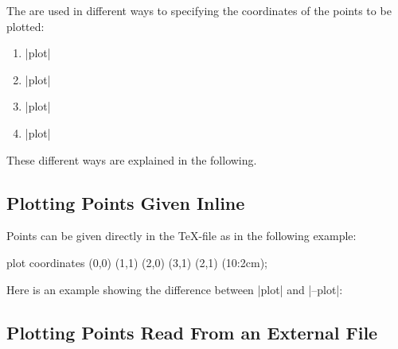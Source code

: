 The  are used in different ways to
specifying the coordinates of the points to be plotted:

\begin{enumerate}
\item
  \opt{|--|}|plot|
\item
  \opt{|--|}|plot|
\item
  \opt{|--|}|plot|
\item
  \opt{|--|}|plot|
\end{enumerate}

These different ways are explained in the following.


\subsection{Plotting Points Given Inline}

Points can be given directly in the \TeX-file
as in the following example:

\begin{codeexample}[]
\tikz \draw plot coordinates {(0,0) (1,1) (2,0) (3,1) (2,1) (10:2cm)};
\end{codeexample}

Here is an example showing the difference between |plot| and |--plot|:

\begin{codeexample}[]
\end{codeexample}


\subsection{Plotting Points Read From an External File}

